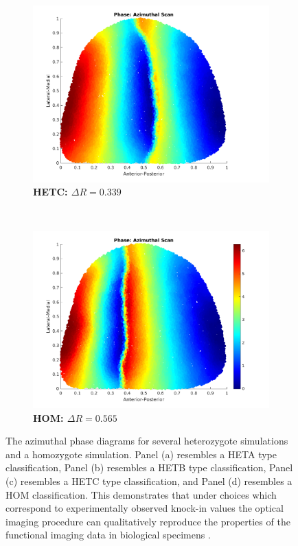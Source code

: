 \begin{figure}[h]
	\begin{subfigure}{0.45\textwidth}
	\centering
	\includegraphics[width=\textwidth]{images/lattice/hetB_DR_12}
	\caption{\textbf{HETC: $\Delta R =  0.339$}}
	\end{subfigure}
~
	\begin{subfigure}{0.45\textwidth}
		\centering
		\includegraphics[width=\textwidth]{images/lattice/hom}
		\caption{\textbf{HOM: $\Delta R =  0.565$}}
	\end{subfigure}
	\def\c{The azimuthal phase diagrams for several heterozygote simulations and a homozygote simulation. }
	\caption[\c]{\c Panel (a) resembles a HETA type classification, Panel (b) resembles a HETB type classification, Panel (c) resembles a HETC type classification, and Panel (d) resembles a HOM classification. This demonstrates that under choices which correspond to experimentally observed knock-in values the optical imaging procedure can qualitatively reproduce the properties of the functional imaging data in biological specimens \cite{Reber2004-wq, Owens2015-zv}.} \label{fig:scans} 
\end{figure}
\FloatBarrier
\newpage
